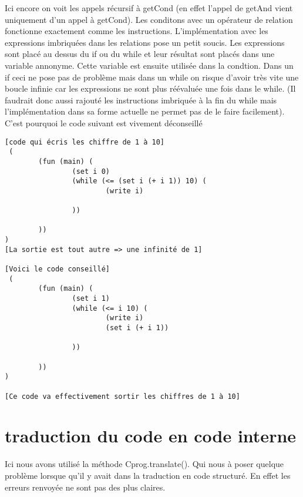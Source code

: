 Ici encore on voit les appels récursif à getCond (en effet l'appel de getAnd vient uniquement d'un appel à getCond). 
Les conditons avec un opérateur de relation fonctionne exactement comme les instructions. 
L'implémentation avec les expressions imbriquées dans les relations pose un petit soucis. Les expressions sont placé au dessus du if
ou du while et leur résultat sont placés dans une variable annonyme. Cette variable est ensuite utilisée dans la condtion.
Dans un if ceci ne pose pas de problème mais dans un while on risque d'avoir très vite une boucle infinie car les expressions ne
sont plus réévaluée une fois dans le while. (Il faudrait donc aussi rajouté les instructions imbriquée à la fin du while mais l'implémentation
dans sa forme actuelle ne permet pas de le faire facilement). C'est pourquoi le code suivant est vivement déconseillé
{\tiny
\begin{verbatim}
[code qui écris les chiffre de 1 à 10]
 (
        (fun (main) (
                (set i 0)
                (while (<= (set i (+ i 1)) 10) (
                        (write i)

                ))

        ))
)
[La sortie est tout autre => une infinité de 1]

[Voici le code conseillé]
 (
        (fun (main) (
                (set i 1)
                (while (<= i 10) (
                        (write i)
                        (set i (+ i 1))

                ))

        ))
)

[Ce code va effectivement sortir les chiffres de 1 à 10]
\end{verbatim}}

\section{traduction du code en code interne}
Ici nous avons utilisé la méthode Cprog.translate(). Qui nous à poser quelque problème lorsque qu'il y avait dans la traduction en code 
structuré. En effet les erreurs renvoyée ne sont pas des plus claires.

